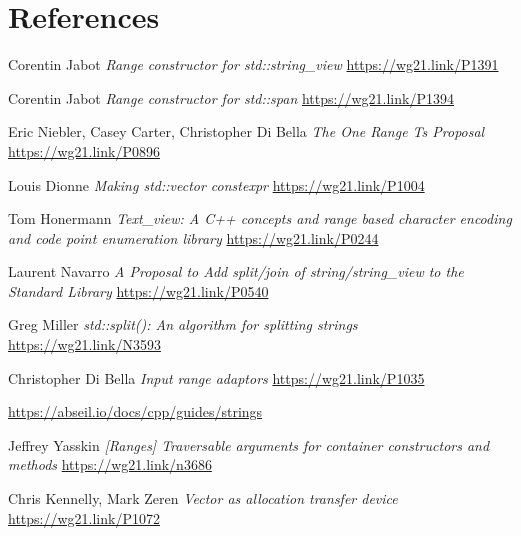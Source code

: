 \documentclass{wg21}
\begin{document}
\section{References}
\renewcommand{\section}[2]{}%
\begin{thebibliography}{9}
	
	Corentin Jabot
	\emph{Range constructor for std::string\_view}\newline
	\url{https://wg21.link/P1391}
	
	Corentin Jabot
	\emph{Range constructor for std::span}\newline
	\url{https://wg21.link/P1394}

    Eric Niebler, Casey Carter, Christopher Di Bella
    \emph{The One Range Ts Proposal}\newline
    \url{https://wg21.link/P0896}

    Louis Dionne
    \emph{Making std::vector constexpr}\newline
    \url{https://wg21.link/P1004}

    Tom Honermann
    \emph{Text_view: A C++ concepts and range based character encoding and code point enumeration library}\newline
    \url{https://wg21.link/P0244}

    Laurent Navarro
    \emph{A Proposal to Add split/join of string/string_view to the Standard Library}\newline
    \url{https://wg21.link/P0540}

    Greg Miller
    \emph{std::split(): An algorithm for splitting strings}\newline
    \url{https://wg21.link/N3593}

    Christopher Di Bella
    \emph{Input range adaptors}\newline
    \url{https://wg21.link/P1035}

    \url{https://abseil.io/docs/cpp/guides/strings}

    Jeffrey Yasskin
    \emph{[Ranges] Traversable arguments for container constructors and methods}\newline
    \url{https://wg21.link/n3686}

	Chris Kennelly, Mark Zeren
	\emph{Vector as allocation transfer device}
	\url{https://wg21.link/P1072}

\end{thebibliography}
\end{document}
